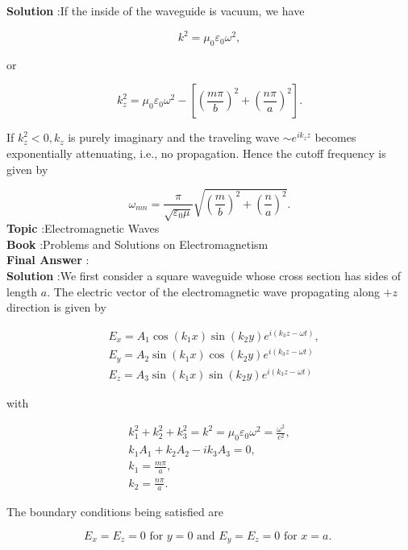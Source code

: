 \documentclass[10pt]{article}
\begin{document}
\textbf{Solution} :If the inside of the waveguide is vacuum, we have

$$
k^{2}=\mu_{0} \varepsilon_{0} \omega^{2},
$$

or

$$
k_{z}^{2}=\mu_{0} \varepsilon_{0} \omega^{2}-\left[\left(\frac{m \pi}{b}\right)^{2}+\left(\frac{n \pi}{a}\right)^{2}\right] .
$$

If $k_{z}^{2}<0, k_{z}$ is purely imaginary and the traveling wave $\sim e^{i k_{z} z}$ becomes exponentially attenuating, i.e., no propagation. Hence the cutoff frequency is given by

$$
\omega_{m n}=\frac{\pi}{\sqrt{\varepsilon_{0} \mu}} \sqrt{\left(\frac{m}{b}\right)^{2}+\left(\frac{n}{a}\right)^{2}} .
$$
\textbf{Topic} :Electromagnetic Waves\\
\textbf{Book} :Problems and Solutions on Electromagnetism\\
\textbf{Final Answer} : \\


\textbf{Solution} :We first consider a square waveguide whose cross section has sides of length $a$. The electric vector of the electromagnetic wave propagating along $+z$ direction is given by

$$
\begin{aligned}
&E_{x}=A_{1} \cos \left(k_{1} x\right) \sin \left(k_{2} y\right) e^{i\left(k_{3} z-\omega t\right)}, \\
&E_{y}=A_{2} \sin \left(k_{1} x\right) \cos \left(k_{2} y\right) e^{i\left(k_{3} z-\omega t\right)} \\
&E_{z}=A_{3} \sin \left(k_{1} x\right) \sin \left(k_{2} y\right) e^{i\left(k_{3} z-\omega t\right)}
\end{aligned}
$$

with

$$
\begin{gathered}
k_{1}^{2}+k_{2}^{2}+k_{3}^{2}=k^{2}=\mu_{0} \varepsilon_{0} \omega^{2}=\frac{\omega^{2}}{c^{2}}, \\
k_{1} A_{1}+k_{2} A_{2}-i k_{3} A_{3}=0, \\
k_{1}=\frac{m \pi}{a}, \\
k_{2}=\frac{n \pi}{a} .
\end{gathered}
$$

The boundary conditions being satisfied are

$$
E_{x}=E_{z}=0 \text { for } y=0 \text { and } E_{y}=E_{z}=0 \text { for } x=a \text {. }
$$
\end{document}
